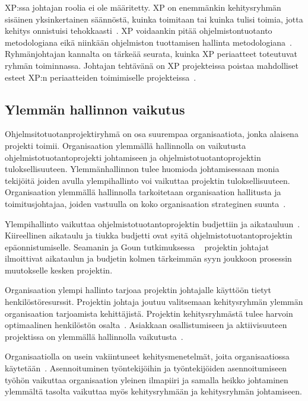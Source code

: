 \documentclass[finnish]{tktltiki2}
\theoremstyle{definition}
\theoremstyle{remark}
\begin{document}
XP:ssa johtajan roolia ei ole määritetty. XP on enemmänkin kehitysryhmän sisäinen yksinkertainen säännöstä, kuinka toimitaan tai kuinka tulisi toimia, jotta kehitys onnistuisi tehokkaasti~\cite{Augustine:2005:APM:1101779.1101781}. XP voidaankin pitää ohjelmistontuotanto metodologiana eikä niinkään ohjelmiston tuottamisen hallinta metodologiana~\cite{cohen2004introduction}. Ryhmänjohtajan kannalta on tärkeää seurata, kuinka XP periaatteet toteutuvat ryhmän toiminnassa. Johtajan tehtävänä on XP projekteissa poistaa mahdolliset esteet XP:n periaatteiden toimimiselle projekteissa~\cite{Augustine:2005:APM:1101779.1101781}.




\subsection{Ylemmän hallinnon vaikutus}

Ohjelmsitotuotanprojektiryhmä on osa suurempaa organisaatiota, jonka alaisena projekti toimii. Organisaation ylemmällä hallinnolla on vaikutusta ohjelmistotuotantoprojekti johtamiseen ja ohjelmistotuotantoprojektin tuloksellisuuteen. Ylemmänhallinnon tulee huomioda johtamisessaan monia tekijöitä joiden avulla ylempihallinto voi vaikuttaa projektin tuloksellisuuteen. Organisaation ylemmällä hallinnolla tarkoitetaan organisaation hallitusta ja toimitusjohtajaa, joiden vastuulla on koko organisaation strateginen suunta~\cite{McLeod:2011:FAS:1978802.1978803}.

Ylempihallinto vaikuttaa ohjelmistotuotantoprojektin budjettiin ja aikatauluun~\cite{McLeod:2011:FAS:1978802.1978803}. Kiireellinen aikataulu ja tiukka budjetti ovat syitä ohjelmistotuotantoprojektin epäonnistumiselle. Seamanin ja Goun tutkimuksessa ~\cite{Guo:2008:SSP:1414004.1414046} projektin johtajat ilmoittivat aikataulun ja budjetin kolmen tärkeimmän syyn joukkoon prosessin muutokselle kesken projektin.

Organisaation ylempi hallinto tarjoaa projektin johtajalle käyttöön tietyt henkilöstöresurssit. Projektin johtaja joutuu valitsemaan kehitysryhmän ylemmän organisaation tarjoamista kehittäjistä. Projektin kehitysryhmästä tulee harvoin optimaalinen henkilöstön osalta~\cite{Dhomne:2012:ITL:2382887.2382899}. Asiakkaan osallistumiseen ja aktiivisuuteen projektissa on ylemmällä hallinnolla vaikutusta~\cite{McLeod:2011:FAS:1978802.1978803}.

Organisaatiolla on usein vakiintuneet kehitysmenetelmät, joita organisaatiossa käytetään~\cite{McLeod:2011:FAS:1978802.1978803}. Asennoituminen työntekijöihin ja työntekijöiden asennoitumiseen työhön vaikuttaa organisaation yleinen ilmapiiri ja samalla heikko johtaminen ylemmältä tasolta vaikuttaa myös kehitysryhmään ja kehitysryhmän johtamiseen.
\end{document}
